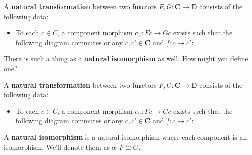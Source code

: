 \documentclass[tikz]{beamer}
\theoremstyle{definition}
\begin{document}
\begin{frame}[fragile]

    \begin{definition}
        A \textbf{natural transformation} between two functors $F,G: \mathbf{C} \to \mathbf{D}$ consists of the following data:

        \begin{itemize}
            \item To each $c \in C$, a component morphism $\alpha_c : Fc \to Gc$ exists such that the following diagram commutes or any $c, c' \in \mathbf{C}$ and $f: c \to c'$:
            \begin{center}
                {}
            \end{center}{}
        \end{itemize}{}

    \end{definition}{}

 There is such a thing as a \textbf{natural isomorphism} as well. How might you define one?
\end{frame}

\begin{frame}[fragile]

    \begin{definition}
        A \textbf{natural transformation} between two functors $F,G: \mathbf{C} \to \mathbf{D}$ consists of the following data:

        \begin{itemize}
            \item To each $c \in C$, a component morphism $\alpha_c : Fc \to Gc$ exists such that the following diagram commutes or any $c, c' \in \mathbf{C}$ and $f: c \to c'$:
            \begin{center}
                {}
            \end{center}{}
        \end{itemize}{}

    \end{definition}{}

    \begin{definition}
      A \textbf{natural isomorphism} is a natural isomorphism where each component is an isomorphism. We'll denote them as $\alpha: F \cong G$.
    \end{definition}{}
\end{frame}
\end{document}
